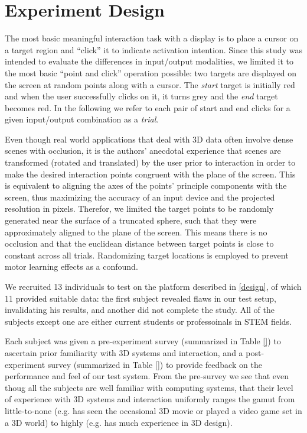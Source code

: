 \section{Experiment Design}\label{sec:experiment}

The most basic meaningful interaction task with a display is to place a cursor
on a target region and ``click'' it to indicate activation intention.  Since
this study was intended to evaluate the differences in input/output
modalities, we limited it to the most basic ``point and click'' operation
possible: two targets are displayed on the screen at random points along with
a cursor.  The \emph{start} target is initially red and when the user
successfully clicks on it, it turns grey and the \emph{end} target becomes
red.  In the following we refer to each pair of start and end clicks for a
given input/output combination as a \emph{trial}.

Even though real world applications that deal with 3D data often involve dense
scenes with occlusion, it is the authors' anecdotal experience that scenes are
transformed (rotated and translated) by the user prior to interaction in order
to make the desired interaction points congruent with the plane of the screen.
This is equivalent to aligning the axes of the points' principle components
with the screen, thus maximizing the accuracy of an input device and the
projected resolution in pixels.  Therefor, we limited the target points to be
randomly generated near the surface of a truncated sphere, such that they were
approximately aligned to the plane of the screen.  This means there is no
occlusion and that the euclidean distance between target points is close to
constant across all trials.  Randomizing target locations is employed to prevent
motor learning effects as a confound.

We recruited 13 individuals to test on the platform described in \ref{design},
of which 11 provided suitable data: the first subject revealed flaws in our
test setup, invalidating his results, and another did not complete the study.
All of the subjects except one are either current students or professoinals in
STEM fields.

Each subject was given a pre-experiment survey (summarized in Table \ref{}) to
ascertain prior familiarity with 3D systems and interaction, and a
post-experiment survey (summarized in Table \ref{}) to provide feedback on the
performance and feel of our test system.  From the pre-survey we see that even
thoug all the subjects are well familiar with computing systems, that their
level of experience with 3D systems and interaction uniformly ranges the gamut
from little-to-none (e.g. has seen the occasional 3D movie or played a video
game set in a 3D world) to highly (e.g. has much experience in 3D design).

